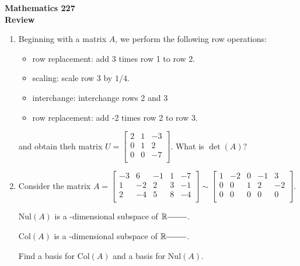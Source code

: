 \documentclass[12pt]{article}
\newcommand{\vs}[1]{\vspace{#1in}}
\newcommand{\real}{{\mathbb R}}
\newcommand{\col}{\text{Col}}
\newcommand{\nul}{\text{Nul}}
\begin{document}
\noindent
{\bf Mathematics 227} \\ 
{\bf Review}

\begin{enumerate}
\item Beginning with a matrix $A$, we perform the following row
  operations:
  \begin{itemize}
  \item row replacement:  add 3 times row 1 to row 2.
  \item scaling:  scale row 3 by $1/4$.
  \item interchange:  interchange rows 2 and 3
  \item row replacement:  add -2 times row 2 to row 3.
  \end{itemize}
  and obtain theh matrix
  $U =
  \left[
    \begin{array}{ccc}
      2 & 1 & -3 \\
      0 & 1 & 2 \\
      0 & 0 & -7 \\
    \end{array}
  \right]
  $.
  What is $\det(A)$?

  \vs{1.5}
\item Consider the matrix
  $A = 
  \left[
    \begin{array}{rrrrr}
      -3 & 6 & -1 & 1 & -7 \\
      1 & -2 & 2 & 3 & -1 \\
      2 & -4 & 5 & 8 & -4 \\
    \end{array}
  \right]
  \sim
  \left[
    \begin{array}{rrrrr}
      1 & -2 & 0 & -1 & 3 \\
      0 & 0 & 1 & 2 & -2 \\
      0 & 0 & 0 & 0 & 0 \\
    \end{array}
  \right]
  $.

  $\nul(A)$ is a \underline{\hspace*{0.5in}}-dimensional subspace of
  $\real^{\underline{\hspace*{24pt}}}$.

  $\col(A)$ is a \underline{\hspace*{0.5in}}-dimensional subspace of
  $\real^{\underline{\hspace*{24pt}}}$.

  Find a basis for $\col(A)$ and a basis for $\nul(A)$.
  
  
  
\end{enumerate}
\end{document}
